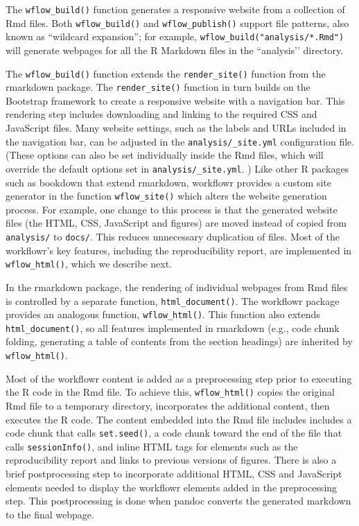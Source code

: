 \documentclass[9pt,a4paper]{extarticle}
\begin{document}
The \texttt{wflow\_build()} function generates a responsive website from a
collection of Rmd files. Both \texttt{wflow\_build()} and \texttt{wflow\_publish()} support
file patterns, also known as “wildcard expansion”; for example,
\texttt{wflow\_build("analysis/*.Rmd")} will generate webpages for all
the R Markdown files in the ``analysis’’ directory.

The \texttt{wflow\_build()} function extends the \texttt{render\_site()} function from the
rmarkdown package. The \texttt{render\_site()} function in turn builds on the
Bootstrap framework to create a responsive website with a navigation
bar. This rendering step includes downloading and linking to the
required CSS and JavaScript files. Many website settings, such as the
labels and URLs included in the navigation bar, can be adjusted in the
\verb|analysis/_site.yml| configuration file. (These options can also be
set individually inside the Rmd files, which will override the default
options set in \texttt{analysis/\_site.yml}. ) Like other R packages
such as bookdown that extend rmarkdown, workflowr provides a custom site
generator in the function \texttt{wflow\_site()} which alters the website
generation process. For example, one change to this process is that the
generated website files (the HTML, CSS, JavaScript and figures) are
moved instead of copied from \verb|analysis/| to \verb|docs/|. This
reduces unnecessary duplication of files. Most of the workflowr’s key
features, including the reproducibility report, are implemented in
\texttt{wflow\_html()}, which we describe next.

In the rmarkdown package, the rendering of individual webpages from Rmd
files is controlled by a separate function, \texttt{html\_document()}. The
workflowr package provides an analogous function, \texttt{wflow\_html()}. This
function also extends \texttt{html\_document()}, so all features implemented in
rmarkdown (e.g., code chunk folding, generating a table of contents from
the section headings) are inherited by \texttt{wflow\_html()}.

Most of the workflowr content is added as a preprocessing step prior to
executing the R code in the Rmd file. To achieve this, \texttt{wflow\_html()}
copies the original Rmd file to a temporary directory, incorporates the
additional content, then executes the R code. The content embedded into
the Rmd file includes includes a code chunk that calls \texttt{set.seed()}, a
code chunk toward the end of the file that calls \texttt{sessionInfo()}, and
inline HTML tags for elements such as the reproducibility report and
links to previous versions of figures. There is also a brief
postprocessing step to incorporate additional HTML, CSS and JavaScript
elements needed to display the workflowr elements added in the
preprocessing step. This postprocessing is done when pandoc converts the
generated markdown to the final webpage.
\end{document}
